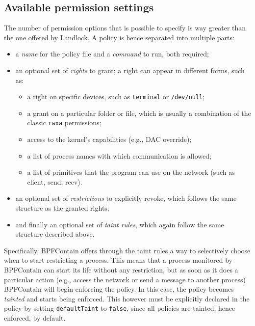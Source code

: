 \subsection{Available permission settings}

The number of permission options that is possible to specify is way greater than the one offered by Landlock.
A policy is hence separated into multiple parts:
\begin{itemize}
  \item a \textit{name} for the policy file and a \textit{command} to run, both required;
  \item an optional set of \textit{rights} to grant; a right can appear in different forms, such as:
        \begin{itemize}
          \item a right on specific devices, such as \texttt{terminal} or \texttt{/dev/null};
          \item a grant on a particular folder or file, which is usually a combination of the classic \texttt{rwxa} permissions;
          \item access to the kernel's capabilities (e.g., DAC override);
          \item a list of process names with which communication is allowed;
          \item a list of primitives that the program can use on the network (such as client, send, recv).
        \end{itemize}
  \item an optional set of \textit{restrictions} to explicitly revoke, which follows the same structure as the
        granted rights;
  \item and finally an optional set of \textit{taint rules}, which again follow the same structure described above.
\end{itemize}

Specifically, BPFContain offers through the taint rules a way to selectively choose when
to start restricting a process.
This means that a process monitored by BPFContain can start its life without any restriction,
but as soon as it does a particular action (e.g., access the network or send a message to another process)
BPFContain will begin enforcing the policy.
In this case, the policy becomes \textit{tainted} and starts being enforced.
This however must be explicitly declared in the policy by setting \texttt{defaultTaint} to \texttt{false},
since all policies are tainted, hence enforced, by default.

